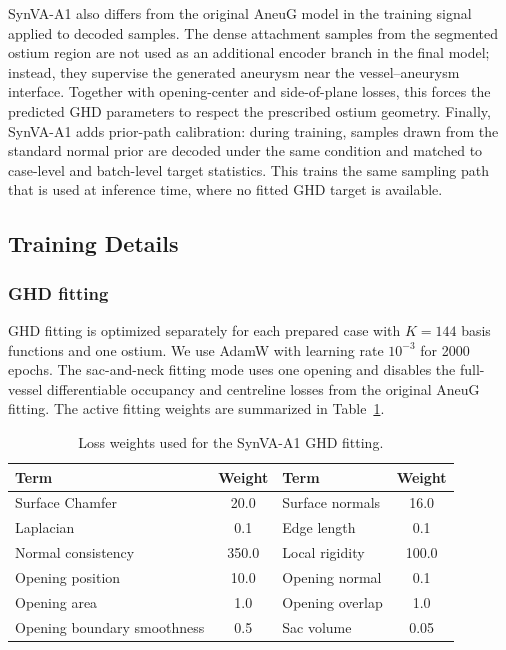 SynVA-A1 also differs from the original AneuG model in the training signal
applied to decoded samples. The dense attachment samples from the segmented
ostium region are not used as an additional encoder branch in the final model;
instead, they supervise the generated aneurysm near the vessel--aneurysm
interface. Together with opening-center and side-of-plane losses, this forces
the predicted GHD parameters to respect the prescribed ostium geometry.
Finally, SynVA-A1 adds prior-path calibration: during training, samples drawn
from the standard normal prior are decoded under the same condition and matched
to case-level and batch-level target statistics. This trains the same sampling
path that is used at inference time, where no fitted GHD target is available.

\subsection{Training Details}

\subsubsection{GHD fitting}

GHD fitting is optimized separately for each prepared case with $K=144$ basis
functions and one ostium. We use AdamW with learning rate
$10^{-3}$ for 2000 epochs. The sac-and-neck fitting mode uses one opening and
disables the full-vessel differentiable occupancy and centreline losses from
the original AneuG fitting. The active fitting weights are summarized in
Table~\ref{tab:synva-a1-ghd-loss-weights}.

\begin{table}[t]
\centering
\caption{Loss weights used for the SynVA-A1 GHD fitting.}
\label{tab:synva-a1-ghd-loss-weights}
\scriptsize
\begin{tabular}{lclc}
\toprule
Term & Weight & Term & Weight \\
\midrule
Surface Chamfer & 20.0 & Surface normals & 16.0 \\
Laplacian & 0.1 & Edge length & 0.1 \\
Normal consistency & 350.0 & Local rigidity & 100.0 \\
Opening position & 10.0 & Opening normal & 0.1 \\
Opening area & 1.0 & Opening overlap & 1.0 \\
Opening boundary smoothness & 0.5 & Sac volume & 0.05 \\
\bottomrule
\end{tabular}
\end{table}

